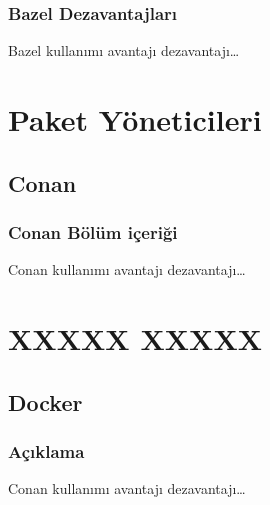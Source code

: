 \documentclass[
]{book}
\begin{document}
\hypertarget{bazel-dezavantajlarux131}{%
\section{Bazel Dezavantajları}\label{bazel-dezavantajlarux131}}

Bazel kullanımı avantajı dezavantajı\ldots{}

\hypertarget{part-paket-yuxf6neticileri}{%
\part{Paket Yöneticileri}\label{part-paket-yuxf6neticileri}}

\hypertarget{conan}{%
\chapter{Conan}\label{conan}}

\hypertarget{conan-buxf6luxfcm-iuxe7eriux11fi}{%
\section{Conan Bölüm içeriği}\label{conan-buxf6luxfcm-iuxe7eriux11fi}}

Conan kullanımı avantajı dezavantajı\ldots{}

\hypertarget{part-xxxxx-xxxxx}{%
\part{XXXXX XXXXX}\label{part-xxxxx-xxxxx}}

\hypertarget{docker}{%
\chapter{Docker}\label{docker}}

\hypertarget{auxe7ux131klama-2}{%
\section{Açıklama}\label{auxe7ux131klama-2}}

Conan kullanımı avantajı dezavantajı\ldots{}
\end{document}
